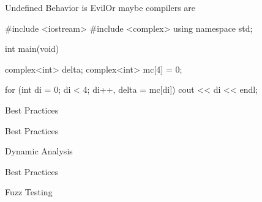 \begin{slide}{Undefined Behavior is Evil}{Or maybe compilers are}
  \begin{nicscolumn}
    \begin{nicsextern}[height=6cm]{}
      #include <iostream>
      #include <complex>
      using namespace std;

      int main(void) {
        complex<int> delta;
        complex<int> mc[4] = {0};

        for (int di = 0; di < 4; di++, delta = mc[di]) {
          cout << di << endl;
        }
      }
    \end{nicsextern}
  \end{nicscolumn}
\end{slide}

\begin{slide}{Best Practices}{}
  \begin{nicscolumn}
  \end{nicscolumn}
\end{slide}

\begin{slide}{Best Practices}{}
  \begin{nicscolumn}
  \end{nicscolumn}
\end{slide}

\begin{slide}{Dynamic Analysis}{}
  \begin{nicscolumn}
    \begin{nicsindent}
    \end{nicsindent}
    \nicsmedskip
  \end{nicscolumn}
\end{slide}

\begin{slide}{Best Practices}{}
  \begin{nicscolumn}
  \end{nicscolumn}
\end{slide}

\begin{slide}{Fuzz Testing}{}
  \begin{nicscolumn}
  \end{nicscolumn}
\end{slide}


